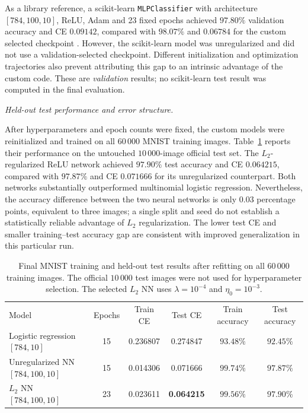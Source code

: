 \documentclass[aps,rmp,reprint,amsmath,amssymb,graphicx,longbibliography]{revtex4-1}
\begin{document}
As a library reference, a scikit-learn \texttt{MLPClassifier} with
architecture $[784,100,10]$, ReLU, Adam and 23 fixed epochs achieved
$97.80\%$ validation accuracy and CE $0.09142$, compared with
$98.07\%$ and $0.06784$ for the custom selected checkpoint
\cite{Pedregosa2011}. However, the scikit-learn model was
unregularized and did not use a validation-selected checkpoint.
Different initialization and optimization trajectories also prevent
attributing this gap to an intrinsic advantage of the custom code.
These are \emph{validation} results; no scikit-learn test result was
computed in the final evaluation.

\noindent\textit{Held-out test performance and error structure.}

After hyperparameters and epoch counts were fixed, the custom models
were reinitialized and trained on all $60\,000$ MNIST training images.
Table~\ref{tab:mnist_test} reports their performance on the untouched
$10\,000$-image official test set. The $L_2$-regularized ReLU network
achieved $97.90\%$ test accuracy and CE $0.064215$, compared with
$97.87\%$ and CE $0.071666$ for its unregularized counterpart. Both
networks substantially outperformed multinomial logistic regression. Nevertheless, the accuracy difference
between the two neural networks is only $0.03$ percentage points,
equivalent to three images; a single split and seed do not establish a
statistically reliable advantage of $L_2$ regularization. The lower
test CE and smaller training--test accuracy gap are
consistent with improved generalization in this particular run.

\begin{table}[t]
\centering
\caption{Final MNIST training and held-out test results after refitting
on all $60\,000$ training images. The official $10\,000$ test images
were not used for hyperparameter selection. The selected $L_2$ NN uses
$\lambda=10^{-4}$ and $\eta_0=10^{-3}$.}
\label{tab:mnist_test}
\begin{ruledtabular}
\begin{tabular}{lccccc}
Model & Epochs & Train CE & Test CE & Train accuracy & Test accuracy \\
Logistic regression $[784,10]$ & 15 & 0.236807 & 0.274847 & $93.48\%$ & $92.45\%$ \\
Unregularized NN $[784,100,10]$ & 15 & 0.014306 & 0.071666 & $99.74\%$ & $97.87\%$ \\
$L_2$ NN $[784,100,10]$ & 23 & 0.023611 & \textbf{0.064215} & $99.56\%$ & $\mathbf{97.90\%}$ \\
\end{tabular}
\end{ruledtabular}
\end{table}
\end{document}
